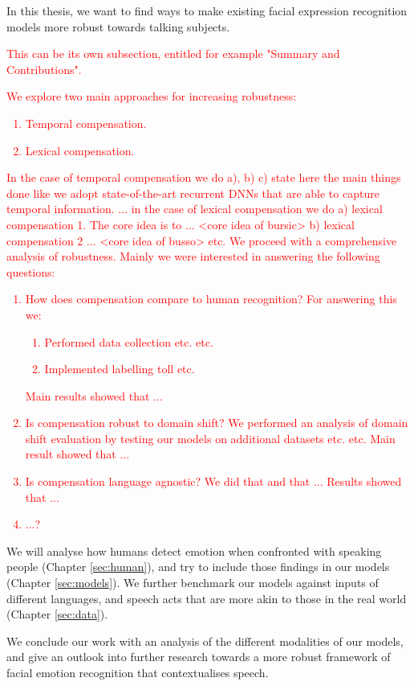 In this thesis, we want to find ways to make existing facial expression recognition models more robust towards talking subjects.

\textcolor{red}{This can be its own subsection, entitled for example "Summary and Contributions".}

\textcolor{red}{We explore two main approaches for increasing robustness: 
\begin{enumerate}
    \item Temporal compensation.
    \item Lexical compensation.
\end{enumerate} 
In the case of temporal compensation we do a), b) c) state here the main things done like we adopt state-of-the-art recurrent DNNs that are able to capture temporal information. ...
in the case of lexical compensation we do a) lexical compensation 1. The core idea is to ... <core idea of bursic> b) lexical compensation 2 ... <core idea of busso> etc.
We proceed with a comprehensive analysis of robustness. Mainly we were interested in answering the following questions: 
\begin{enumerate}
    \item How does compensation compare to human recognition? For answering this we: 
    \begin{enumerate}
        \item Performed data collection etc. etc. 
        \item Implemented labelling toll etc. 
    \end{enumerate}
    Main results showed that ...
    \item Is compensation robust to domain shift?
    We performed an analysis of domain shift evaluation by testing our models on additional datasets etc. etc.
    Main result showed that ...
    \item Is compensation language agnostic?
    We did that and that ...
    Results showed that ...
    \item ...?
\end{enumerate}
}

We will analyse how humans detect emotion when confronted with speaking people (Chapter \ref{sec:human}), and try to include those findings in our models (Chapter \ref{sec:models}). We further benchmark our models against inputs of different languages, and speech acts that are more akin to those in the real world (Chapter \ref{sec:data}).

We conclude our work with an analysis of the different modalities of our models, and give an outlook into further research towards a more robust framework of facial emotion recognition that contextualises speech.

